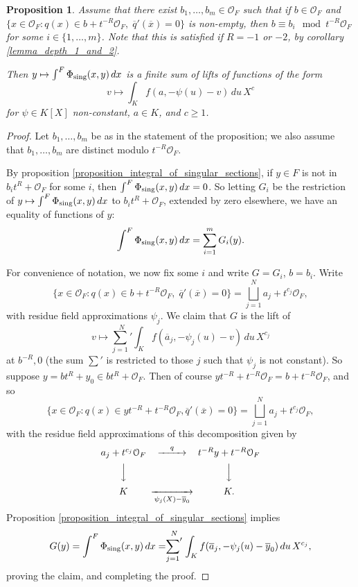 \documentclass{lmsMODIFIED}
\newtheorem{proposition}[theorem]{Proposition}
\newcommand{\roi}{\mathcal{O}}
\newcommand{\res}[1]{\overline{#1}}
\newcommand{\sub}[1]{{\mbox{\scriptsize {#1}}}}
\begin{document}
\begin{proposition}\label{proposition_finite_image}
Assume that there exist $b_1,\dots,b_m\in\roi_{F}$ such that if $b\in\roi_{F}$ and $\{x\in\roi_{F}:q(x)\in b+t^{-R}\roi_{F},\;\res{q}'(\res{x})=0\}$ is non-empty, then $b\equiv b_i\mod t^{-R}\roi_{F}$ for some $i\in\{1,\dots,m\}$. Note that this is satisfied if $R=-1$ or $-2$, by corollary \ref{lemma_depth_1_and_2}.

Then $y\mapsto\int^F\Phi_\sub{sing}(x,y)\,dx$ is a finite sum of lifts of functions of the form \[v\mapsto \int_K f(a,-\psi(u)-v)\,du\,X^{c}\] for $\psi\in K[X]$ non-constant, $a\in K$, and $c\ge 1$.
\end{proposition}
\begin{proof}
Let $b_1,\dots,b_m$ be as in the statement of the proposition; we also assume that $b_1,\dots,b_m$ are distinct modulo $t^{-R}\roi_{F}$.

By proposition \ref{proposition_integral_of_singular_sections}, if $y\in F$ is not in $b_it^R+\roi_{F}$ for some $i$, then $\int^F\Phi_\sub{sing}(x,y)\,dx=0$. So letting $G_i$ be the restriction of $y\mapsto\int^F\Phi_\sub{sing}(x,y)\,dx$ to $b_it^R+\roi_{F}$, extended by zero elsewhere, we have an equality of functions of $y$: \[\int^F\Phi_\sub{sing}(x,y)\,dx=\sum_{i=1}^mG_i(y).\]

For convenience of notation, we now fix some $i$ and write $G=G_i$, $b=b_i$. Write \[\{x\in\roi_{F}:q(x)\in b+t^{-R}\roi_{F},\;\res{q}'(\res{x})=0\}=\bigsqcup_{j=1}^Na_j+t^{c_j}\roi_{F},\] with residue field approximations $\psi_j$. We claim that $G$ is the lift of \[v\mapsto\stackrel{N}{{\sum_{j=1}}'} \int_K f(\res{a}_j,-\psi_j(u)-v)\,du\,X^{c_j}\] at $b^{-R},0$ (the sum ${\sum}'$ is restricted to those $j$ such that $\psi_j$ is not constant). So suppose $y=bt^R+y_0\in bt^R+\roi_{F}$. Then of course $yt^{-R}+t^{-R}\roi_{F}=b+t^{-R}\roi_{F}$, and so \[\{x\in\roi_{F}:q(x)\in yt^{-R}+t^{-R}\roi_{F},\res{q}'(\res{x})=0\}=\bigsqcup_{j=1}^Na_j+t^{c_j}\roi_{F},\] with the residue field approximations of this decomposition given by
\[\begin{CD}
a_j+t^{c_j}\roi_{F} @>q>> t^{-R}y+t^{-R}\roi_{F} \\
@VVV  @VVV  \\
 K  @>>\psi_j(X)-\res{y}_0>  K .\\
\end{CD}\]
Proposition \ref{proposition_integral_of_singular_sections} implies \[G(y)=\int^F\Phi_\sub{sing}(x,y)\,dx=\stackrel{N}{{\sum_{j=1}}'} \int_K f(\res{a}_j,-\psi_j(u)-\res{y}_0)\,du\,X^{c_j},\] proving the claim, and completing the proof.
\end{proof}
\end{document}
